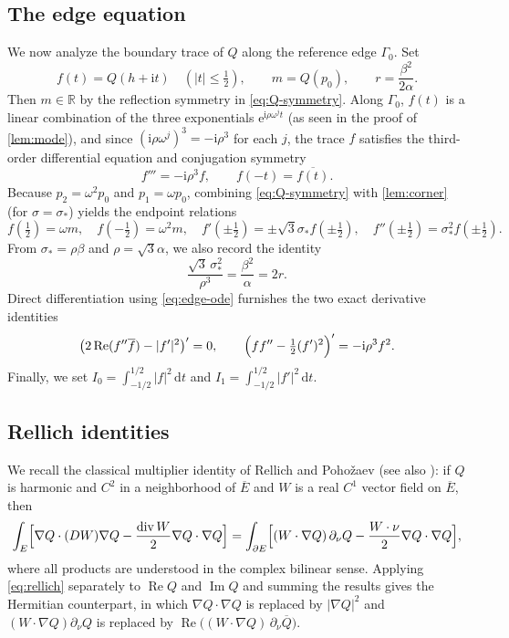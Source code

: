 \documentclass[11pt,reqno]{amsart}
\numberwithin{equation}{section}
\theoremstyle{remark}
\newcommand{\R}{\mathbb R}
\newcommand{\dd}{\,\mathrm d}
\newcommand{\ii}{\mathrm i}
\newcommand{\ee}{\mathrm e}
\newcommand{\om}{\omega}
\DeclareMathOperator{\Rea}{Re}
\DeclareMathOperator{\Ima}{Im}
\begin{document}
\subsection{The edge equation}
We now analyze the boundary trace of $Q$ along the reference edge $\Gamma_0$. Set
\[
 f(t)=Q(h+\ii t)\quad(|t|\le\tfrac12),\qquad m=Q(p_0),\qquad
 r=\frac{\beta^2}{2\alpha}.
\]
Then $m\in\R$ by the reflection symmetry in \eqref{eq:Q-symmetry}. Along $\Gamma_0$,
$f(t)$ is a linear combination of the three exponentials $\ee^{\ii\rho\om^jt}$
(as seen in the proof of \cref{lem:mode}), and since $(\ii\rho\om^j)^3=-\ii\rho^3$
for each $j$, the trace $f$ satisfies the third-order differential equation and
conjugation symmetry
\begin{equation}\label{eq:edge-ode}
 f'''=-\ii\rho^3f,\qquad f(-t)=\overline{f(t)}.
\end{equation}
Because $p_2=\om^2p_0$ and $p_1=\om p_0$, combining \eqref{eq:Q-symmetry} with
\cref{lem:corner} (for $\sigma=\sigma_*$) yields the endpoint relations
\begin{equation}\label{eq:endpoints}
 f(\tfrac12)=\om m,\quad f(-\tfrac12)=\om^2m,\quad
 f'(\pm\tfrac12)=\pm\sqrt3\sigma_*f(\pm\tfrac12),\quad
 f''(\pm\tfrac12)=\sigma_*^2f(\pm\tfrac12).
\end{equation}
From $\sigma_*=\rho\beta$ and $\rho=\sqrt3\alpha$, we also record the identity
\begin{equation}\label{eq:2r}
 \frac{\sqrt3\,\sigma_*^2}{\rho^3}=\frac{\beta^2}{\alpha}=2r.
\end{equation}
Direct differentiation using \eqref{eq:edge-ode} furnishes the two exact
derivative identities
\begin{equation}\label{eq:first-integrals}
 \bigl(2\Rea(f''\overline f)-|f'|^2\bigr)'=0,\qquad
 \Bigl(ff''-\tfrac12(f')^2\Bigr)'=-\ii\rho^3f^2.
\end{equation}
Finally, we set $I_0=\int_{-1/2}^{1/2}|f|^2\dd t$ and
$I_1=\int_{-1/2}^{1/2}|f'|^2\dd t$.

\subsection{Rellich identities}
We recall the classical multiplier identity of Rellich \cite{Rellich} and
Poho\v{z}aev \cite{Pohozaev} (see also \cite{LP}): if $Q$ is harmonic and
$C^2$ in a neighborhood of $\overline E$ and $W$ is a real $C^1$ vector field on
$\overline E$, then
\begin{equation}\label{eq:rellich}
 \int_E\Bigl[\nabla Q\cdot(DW)\nabla Q
   -\frac{\operatorname{div}W}{2}\nabla Q\cdot\nabla Q\Bigr]
 =\int_{\partial E}\Bigl[(W\cdot\nabla Q)\,\partial_\nu Q
   -\frac{W\cdot\nu}{2}\nabla Q\cdot\nabla Q\Bigr],
\end{equation}
where all products are understood in the complex bilinear sense. Applying
\eqref{eq:rellich} separately to $\Rea Q$ and $\Ima Q$ and summing the results
gives the Hermitian counterpart, in which $\nabla Q\cdot\nabla Q$ is replaced by
$|\nabla Q|^2$ and $(W\cdot\nabla Q)\partial_\nu Q$ is replaced by
$\Rea\bigl((W\cdot\nabla Q)\,\partial_\nu\overline Q\bigr)$.
\end{document}
